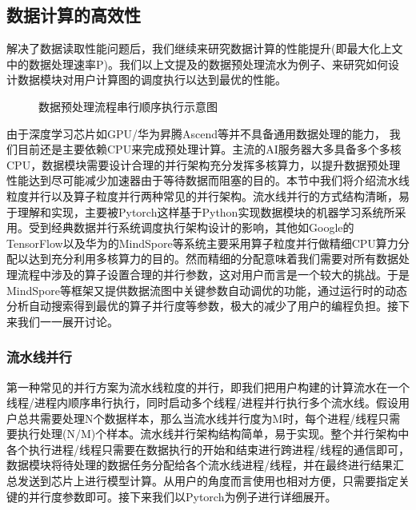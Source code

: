 \documentclass[letterpaper,10pt,english]{sphinxmanual}
\let\sphinxpxdimen\pdfpxdimen\else\newdimen\sphinxpxdimen
\begin{document}
\subsection{数据计算的高效性}
\label{\detokenize{chapter_data_processing/performance:id5}}
\sphinxAtStartPar
解决了数据读取性能问题后，我们继续来研究数据计算的性能提升(即最大化上文中的数据处理速率P)。我们以上文提及的数据预处理流水为例子、来研究如何设计数据模块对用户计算图的调度执行以达到最优的性能。

\begin{figure}[H]
\centering
\capstart

\noindent\sphinxincludegraphics[width=800\sphinxpxdimen]{{single_pipeline}.png}
\caption{数据预处理流程串行顺序执行示意图}\label{\detokenize{chapter_data_processing/performance:id17}}\label{\detokenize{chapter_data_processing/performance:serialized-data-process}}\end{figure}

\sphinxAtStartPar
由于深度学习芯片如GPU/华为昇腾Ascend等并不具备通用数据处理的能力，
我们目前还是主要依赖CPU来完成预处理计算。主流的AI服务器大多具备多个多核CPU，数据模块需要设计合理的并行架构充分发挥多核算力，以提升数据预处理性能达到尽可能减少加速器由于等待数据而阻塞的目的。本节中我们将介绍流水线粒度并行以及算子粒度并行两种常见的并行架构。流水线并行的方式结构清晰，易于理解和实现，主要被Pytorch这样基于Python实现数据模块的机器学习系统所采用。受到经典数据并行系统调度执行架构设计的影响，其他如Google的TensorFlow以及华为的MindSpore等系统主要采用算子粒度并行做精细CPU算力分配以达到充分利用多核算力的目的。然而精细的分配意味着我们需要对所有数据处理流程中涉及的算子设置合理的并行参数，这对用户而言是一个较大的挑战。于是MindSpore等框架又提供数据流图中关键参数自动调优的功能，通过运行时的动态分析自动搜索得到最优的算子并行度等参数，极大的减少了用户的编程负担。接下来我们一一展开讨论。


\subsubsection{流水线并行}
\label{\detokenize{chapter_data_processing/performance:id6}}
\sphinxAtStartPar
第一种常见的并行方案为流水线粒度的并行，即我们把用户构建的计算流水在一个线程/进程内顺序串行执行，同时启动多个线程/进程并行执行多个流水线。假设用户总共需要处理N个数据样本，那么当流水线并行度为M时，每个进程/线程只需要执行处理(N/M)个样本。流水线并行架构结构简单，易于实现。整个并行架构中各个执行进程/线程只需要在数据执行的开始和结束进行跨进程/线程的通信即可，数据模块将待处理的数据任务分配给各个流水线进程/线程，并在最终进行结果汇总发送到芯片上进行模型计算。从用户的角度而言使用也相对方便，只需要指定关键的并行度参数即可。接下来我们以Pytorch为例子进行详细展开。
\end{document}
